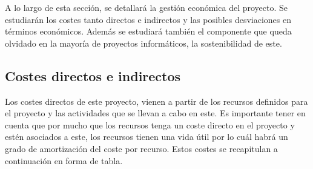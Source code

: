 

A lo largo de esta sección, se detallará la gestión económica del proyecto. Se estudiarán los costes tanto directos e indirectos y las posibles desviaciones en términos económicos. Además se estudiará también el componente que queda olvidado en la mayoría de proyectos informáticos, la sostenibilidad de este.

\subsection{Costes directos e indirectos}

Los costes directos de este proyecto, vienen a partir de los recursos definidos para el proyecto y las actividades que se llevan a cabo en este. Es importante tener en cuenta que por mucho que los recursos tenga un coste directo en el proyecto y estén asociados a este, los recursos tienen una vida útil por lo cuál habrá un grado de amortización del coste por recurso. Estos costes se recapitulan a continuación en forma de tabla.

